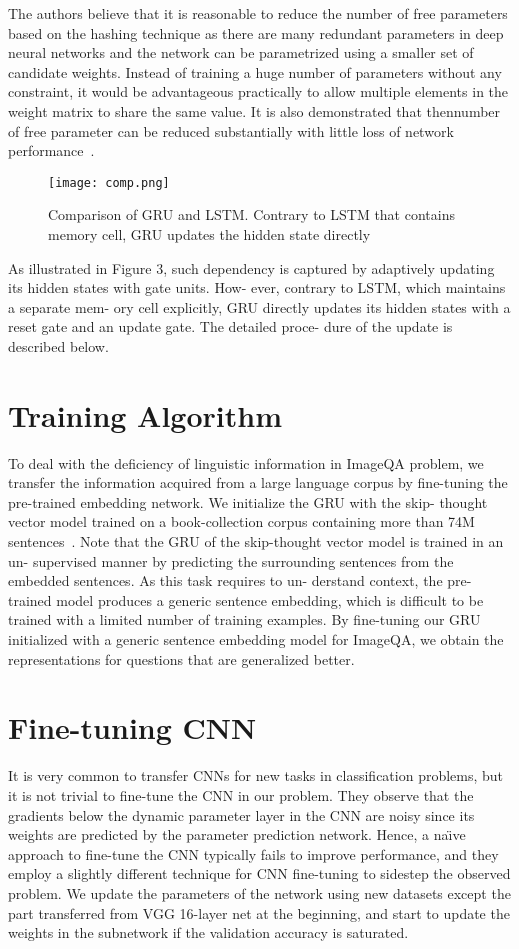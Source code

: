 \documentclass[10pt,twocolumn,letterpaper]{article}
\begin{document}
\par The authors believe that it is reasonable to reduce the number of free parameters based on the hashing technique as there are many redundant parameters in deep neural networks and the network can be parametrized using a smaller set of candidate weights. Instead of training a huge number of parameters without any constraint, it would be advantageous practically to allow multiple elements in the weight matrix to share the same value. It is also demonstrated that thennumber of free parameter can be reduced substantially with little loss of network performance~\cite{name3}.
\begin{figure}[!htb]
 \centering
 \texttt{[image: comp.png]}\\
 \caption{Comparison of GRU and LSTM. Contrary to LSTM that
contains memory cell, GRU updates the hidden state directly}\label{Figure1}
 \end{figure}
 \par As illustrated in Figure 3, such dependency is captured by
adaptively updating its hidden states with gate units. How-
ever, contrary to LSTM, which maintains a separate mem-
ory cell explicitly, GRU directly updates its hidden states
with a reset gate and an update gate. The detailed proce-
dure of the update is described below.
\section{Training Algorithm}
To deal with the deficiency of linguistic information in
ImageQA problem, we transfer the information acquired
from a large language corpus by fine-tuning the pre-trained
embedding network. We initialize the GRU with the skip-
thought vector model trained on a book-collection corpus
containing more than 74M sentences~\cite{name14}. Note that the
GRU of the skip-thought vector model is trained in an un-
supervised manner by predicting the surrounding sentences
from the embedded sentences. As this task requires to un-
derstand context, the pre-trained model produces a generic
sentence embedding, which is difficult to be trained with
a limited number of training examples. By fine-tuning our
GRU initialized with a generic sentence embedding model
for ImageQA, we obtain the representations for questions
that are generalized better.
\section{Fine-tuning CNN}
It is very common to transfer CNNs for new tasks in
classification problems, but it is not trivial to fine-tune the
CNN in our problem. They observe that the gradients below
the dynamic parameter layer in the CNN are noisy since its
weights are predicted by the parameter prediction network.
Hence, a naı̈ve approach to fine-tune the CNN typically fails to improve performance, and they employ a slightly different technique for CNN fine-tuning to sidestep the observed problem. We update the parameters of the network using
new datasets except the part transferred from VGG 16-layer
net at the beginning, and start to update the weights in the
subnetwork if the validation accuracy is saturated.
\end{document}
